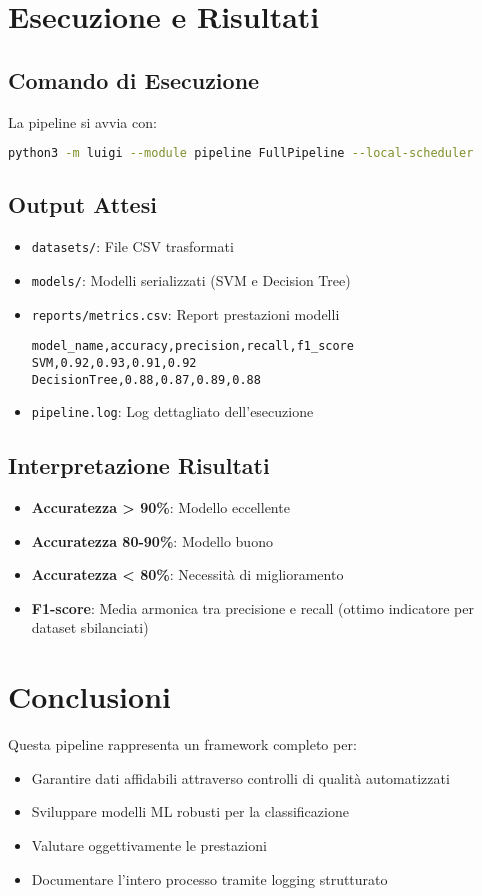\documentclass[a4paper, 12pt]{article}
\begin{document}
\section{Esecuzione e Risultati}

\subsection{Comando di Esecuzione}
La pipeline si avvia con:
\begin{lstlisting}[language=bash]
python3 -m luigi --module pipeline FullPipeline --local-scheduler
\end{lstlisting}

\subsection{Output Attesi}
\begin{itemize}
    \item \texttt{datasets/}: File CSV trasformati
    \item \texttt{models/}: Modelli serializzati (SVM e Decision Tree)
    \item \texttt{reports/metrics.csv}: Report prestazioni modelli
    \begin{lstlisting}
model_name,accuracy,precision,recall,f1_score
SVM,0.92,0.93,0.91,0.92
DecisionTree,0.88,0.87,0.89,0.88
    \end{lstlisting}
    \item \texttt{pipeline.log}: Log dettagliato dell'esecuzione
\end{itemize}

\subsection{Interpretazione Risultati}
\begin{itemize}
    \item \textbf{Accuratezza > 90\%}: Modello eccellente
    \item \textbf{Accuratezza 80-90\%}: Modello buono
    \item \textbf{Accuratezza < 80\%}: Necessità di miglioramento
    \item \textbf{F1-score}: Media armonica tra precisione e recall (ottimo indicatore per dataset sbilanciati)
\end{itemize}

\section{Conclusioni}
Questa pipeline rappresenta un framework completo per:
\begin{itemize}
    \item Garantire dati affidabili attraverso controlli di qualità automatizzati
    \item Sviluppare modelli ML robusti per la classificazione
    \item Valutare oggettivamente le prestazioni
    \item Documentare l'intero processo tramite logging strutturato
\end{itemize}
\end{document}
